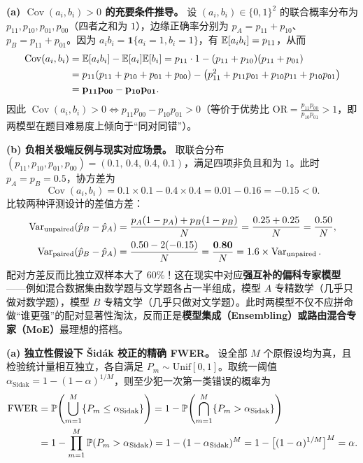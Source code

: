 
\textbf{(a) $\operatorname{Cov}(a_i, b_i) > 0$ 的充要条件推导。}
设 $(a_i, b_i) \in \{0,1\}^2$ 的联合概率分布为 $p_{11}, p_{10}, p_{01}, p_{00}$（四者之和为 $1$），边缘正确率分别为 $p_A = p_{11} + p_{10}$、$p_B = p_{11} + p_{01}$。因为 $a_i b_i = \mathbf{1}\{a_i=1, b_i=1\}$，有 $\mathbb{E}[a_i b_i] = p_{11}$，从而
\begin{align*}
  \operatorname{Cov}(a_i, b_i)
  &= \mathbb{E}[a_i b_i] - \mathbb{E}[a_i]\mathbb{E}[b_i]
   = p_{11}\cdot 1 - (p_{11} + p_{10})(p_{11} + p_{01}) \\
  &= p_{11}(p_{11} + p_{10} + p_{01} + p_{00}) - \big(p_{11}^2 + p_{11}p_{01} + p_{10}p_{11} + p_{10}p_{01}\big) \\
  &= \mathbf{p_{11}p_{00} - p_{10}p_{01}}.
\end{align*}
因此 $\operatorname{Cov}(a_i, b_i) > 0 \iff p_{11}p_{00} - p_{10}p_{01} > 0$（等价于优势比 $\mathrm{OR} = \frac{p_{11}p_{00}}{p_{10}p_{01}} > 1$，即两模型在题目难易度上倾向于“同对同错”）。

\textbf{(b) 负相关极端反例与现实对应场景。}
取联合分布 $(p_{11}, p_{10}, p_{01}, p_{00}) = (0.1,\, 0.4,\, 0.4,\, 0.1)$，满足四项非负且和为 $1$。此时 $p_A = p_B = 0.5$，协方差为
\[
  \operatorname{Cov}(a_i, b_i) = 0.1 \times 0.1 - 0.4 \times 0.4 = 0.01 - 0.16 = \mathbf{-0.15} < 0.
\]
比较两种评测设计的差值方差：
\begin{align*}
  \operatorname{Var}_{\text{unpaired}}(\hat{p}_B - \hat{p}_A)
  &= \frac{p_A(1-p_A) + p_B(1-p_B)}{N} = \frac{0.25 + 0.25}{N} = \frac{0.50}{N}, \\
  \operatorname{Var}_{\text{paired}}(\hat{p}_B - \hat{p}_A)
  &= \frac{0.50 - 2(-0.15)}{N} = \frac{\mathbf{0.80}}{N} = 1.6 \times \operatorname{Var}_{\text{unpaired}}.
\end{align*}
配对方差反而比独立双样本大了 $60\%$！这在现实中对应\textbf{强互补的偏科专家模型}——例如混合数据集由数学题与文学题各占一半组成，模型 $A$ 专精数学（几乎只做对数学题），模型 $B$ 专精文学（几乎只做对文学题）。此时两模型不仅不应拼命做“谁更强”的配对显著性淘汰，反而正是\textbf{模型集成（Ensembling）或路由混合专家（MoE）}最理想的搭档。


\textbf{(a) 独立性假设下 \v{S}id\'ak 校正的精确 FWER。}
设全部 $M$ 个原假设均为真，且检验统计量相互独立，各自满足 $P_m \sim \mathrm{Unif}[0,1]$。取统一阈值 $\alpha_{\text{Sidak}} = 1 - (1-\alpha)^{1/M}$，则至少犯一次第一类错误的概率为
\begin{align*}
  \mathrm{FWER}
  &= \mathbb{P}\!\left(\bigcup_{m=1}^M \{P_m \le \alpha_{\text{Sidak}}\}\right)
   = 1 - \mathbb{P}\!\left(\bigcap_{m=1}^M \{P_m > \alpha_{\text{Sidak}}\}\right) \\
  &= 1 - \prod_{m=1}^M \mathbb{P}(P_m > \alpha_{\text{Sidak}})
   = 1 - (1 - \alpha_{\text{Sidak}})^M
   = 1 - \big[(1 - \alpha)^{1/M}\big]^M = \mathbf{\alpha}.
\end{align*}

